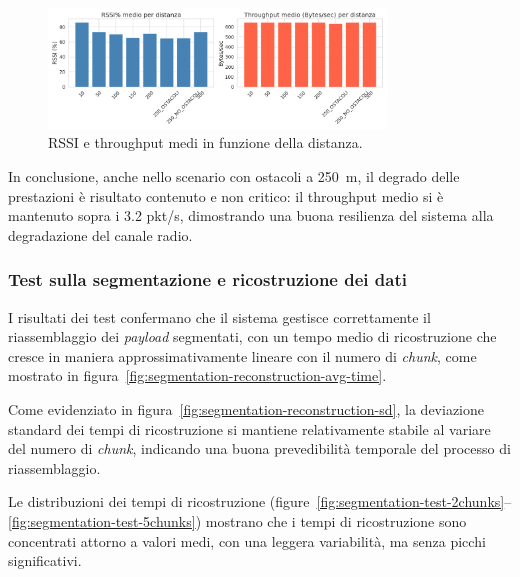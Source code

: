 \documentclass[12pt,a4paper,twoside]{book}
\begin{document}
\begin{figure}[H]
    \centering
    \includegraphics[width=0.8\textwidth]{img/tests/T1/T1-rssi_throughput_col.png}
    \caption{RSSI e throughput medi in funzione della distanza.}
    \label{fig:RSSI-throughput-dist}
\end{figure}

In conclusione, anche nello scenario con ostacoli a 250~m, il degrado delle prestazioni
è risultato contenuto e non critico: il throughput medio si è mantenuto sopra i
3.2 pkt/s, dimostrando una buona resilienza del sistema alla degradazione del canale radio.

\subsubsection{Test sulla segmentazione e ricostruzione dei dati}
I risultati dei test confermano che il sistema gestisce correttamente il riassemblaggio
dei \emph{payload} segmentati, con un tempo medio di ricostruzione che cresce in
maniera approssimativamente lineare con il numero di \emph{chunk}, come mostrato
in figura~\ref{fig:segmentation-reconstruction-avg-time}.

Come evidenziato in figura~\ref{fig:segmentation-reconstruction-sd}, la deviazione standard
dei tempi di ricostruzione si mantiene relativamente stabile al variare del numero di \emph{chunk},
indicando una buona prevedibilità temporale del processo di riassemblaggio.

Le distribuzioni dei tempi di ricostruzione (figure~\ref{fig:segmentation-test-2chunks}–\ref{fig:segmentation-test-5chunks})
mostrano che i tempi di ricostruzione sono concentrati attorno a valori medi, con una
leggera variabilità, ma senza picchi significativi.
\end{document}
